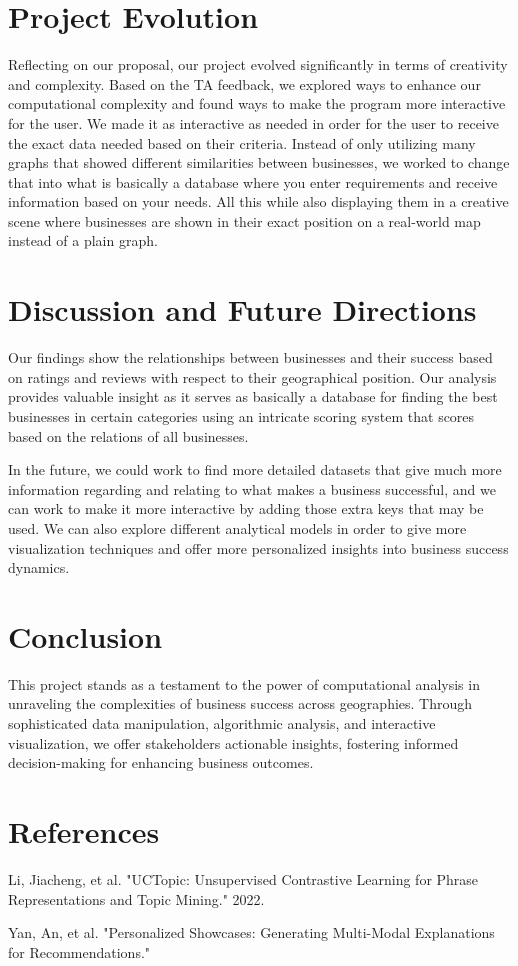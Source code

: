\documentclass[fontsize=11pt]{article}
\begin{document}
\section*{Project Evolution}

Reflecting on our proposal, our project evolved significantly in terms of creativity and complexity. Based on the TA feedback, we explored ways to enhance our computational complexity and found ways to make the program more interactive for the user. We made it as interactive as needed in order for the user to receive the exact data needed based on their criteria. Instead of only utilizing many graphs that showed different similarities between businesses, we worked to change that into what is basically a database where you enter requirements and receive information based on your needs. All this while also displaying them in a creative scene where businesses are shown in their exact position on a real-world map instead of a plain graph.

\section*{Discussion and Future Directions}

Our findings show the relationships between businesses and their success based on ratings and reviews with respect to their geographical position. Our analysis provides valuable insight as it serves as basically a database for finding the best businesses in certain categories using an intricate scoring system that scores based on the relations of all businesses.

In the future, we could work to find more detailed datasets that give much more information regarding and relating to what makes a business successful, and we can work to make it more interactive by adding those extra keys that may be used. We can also explore different analytical models in order to give more visualization techniques and offer more personalized insights into business success dynamics.

\section*{Conclusion}

This project stands as a testament to the power of computational analysis in unraveling the complexities of business success across geographies. Through sophisticated data manipulation, algorithmic analysis, and interactive visualization, we offer stakeholders actionable insights, fostering informed decision-making for enhancing business outcomes.

\section*{References}

Li, Jiacheng, et al. "UCTopic: Unsupervised Contrastive Learning for Phrase Representations and Topic Mining." 2022.

Yan, An, et al. "Personalized Showcases: Generating Multi-Modal Explanations for Recommendations."
\end{document}
